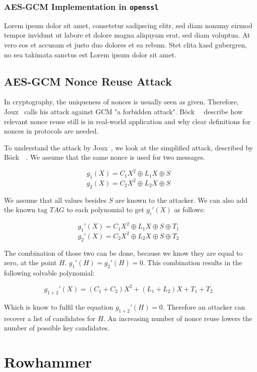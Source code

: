 \subsubsection{AES-GCM Implementation in \texttt{openssl}}

Lorem ipsum dolor sit amet, consetetur sadipscing elitr, sed diam nonumy eirmod
tempor invidunt ut labore et dolore magna aliquyam erat, sed diam voluptua. At
vero eos et accusam et justo duo dolores et ea rebum. Stet clita kasd gubergren,
no sea takimata sanctus est Lorem ipsum dolor sit amet.

\subsection{AES-GCM Nonce Reuse Attack}

In cryptography, the uniqueness of nonces is usually seen as given. Therefore,
Joux~\cite{NISTGCMcomment} calls his attack against GCM "a forbidden attack".
Böck~\etal~\cite{gcmnonceattack} describe how relevant nonce reuse still is in
real-world application and why clear definitions for nonces in protocols
are needed.

To understand the attack by Joux~\cite{NISTGCMcomment}, we look at the
simplified attack, described by Böck~\etal~\cite{gcmnonceattack}. We assume
that the same nonce is used for two messages.

\[g_1(X) = C{_{1}X^2 \oplus L_1X \oplus S}\]
\[g_2(X) = C{_{2}X^2 \oplus L_2X \oplus S}\]

We assume that all values besides $S$ are known to the attacker. We can also
add the known tag $TAG$ to each polynomial to get $g_i'(X)$ as follows:

\[g_1'(X) = C{_{1}X^2 \oplus L_1X \oplus S \oplus T_1}\]
\[g_2'(X) = C{_{2}X^2 \oplus L_2X \oplus S \oplus T_2}\]

The combination of those two can be done, because we know they are equal to
zero, at the point $H$. $g_1'(H) = g_2'(H) = 0$. This combination results in
the following solvable polynomial:

\[g_{1+2}'(X) = (C_{1} + C_{2})X^2 + (L_1 + L_2)X + T_1 + T_2\]

Which is know to fulfil the equation $g_{1+2}'(H) = 0$. Therefore an attacker
can recover a list of candidates for $H$. An increasing number of nonce
reuse lowers the number of possible key candidates.


\section{Rowhammer}

